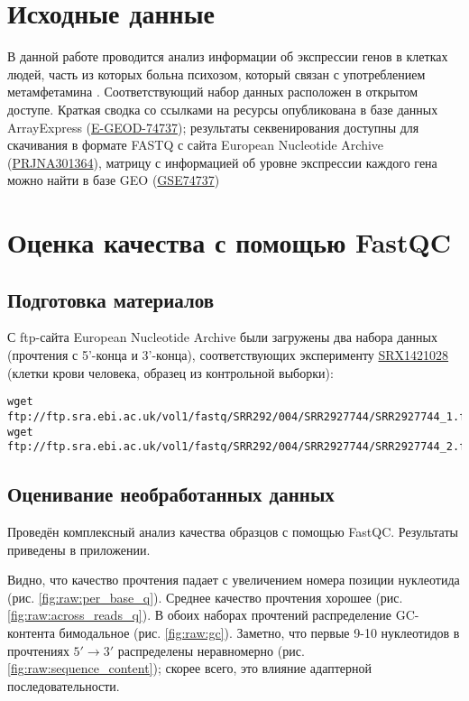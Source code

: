 \documentclass[a4paper,12pt]{article}
\begin{document}


\section{Исходные данные}

В данной работе проводится анализ информации об экспрессии генов в клетках людей, часть из которых больна психозом, который связан с употреблением метамфетамина \cite{breen}.
Соответствующий набор данных расположен в открытом доступе. Краткая сводка со ссылками на ресурсы опубликована в базе данных ArrayExpress (\href{https://www.ebi.ac.uk/arrayexpress/experiments/E-GEOD-74737/}{E-GEOD-74737}); результаты секвенирования доступны для скачивания в формате FASTQ с сайта European Nucleotide Archive (\href{https://www.ebi.ac.uk/ena/browser/view/PRJNA301364}{PRJNA301364}), матрицу с информацией об уровне экспрессии каждого гена можно найти в базе GEO (\href{https://www.ncbi.nlm.nih.gov/geo/query/acc.cgi?acc=GSE74737}{GSE74737})

\section{Оценка качества с помощью FastQC}

\subsection{Подготовка материалов}

С ftp-сайта European Nucleotide Archive были загружены два набора данных (прочтения с 5'-конца и 3'-конца), соответствующих эксперименту \href{https://www.ebi.ac.uk/ena/browser/view/SRX1421028}{SRX1421028} (клетки крови человека, образец из контрольной выборки):

\begin{lstlisting}
wget ftp://ftp.sra.ebi.ac.uk/vol1/fastq/SRR292/004/SRR2927744/SRR2927744_1.fastq.gz
wget ftp://ftp.sra.ebi.ac.uk/vol1/fastq/SRR292/004/SRR2927744/SRR2927744_2.fastq.gz
\end{lstlisting}

\subsection{Оценивание необработанных данных}

Проведён комплексный анализ качества образцов с помощью FastQC.
Результаты приведены в приложении.

Видно, что качество прочтения падает с увеличением номера позиции нуклеотида (рис. \ref{fig:raw:per_base_q}).
Среднее качество прочтения хорошее (рис. \ref{fig:raw:across_reads_q}).
В обоих наборах прочтений распределение GC-контента бимодальное (рис. \ref{fig:raw:gc}).
Заметно, что первые 9-10 нуклеотидов в прочтениях $ 5' \to 3'$ распределены неравномерно (рис. \ref{fig:raw:sequence_content}); скорее всего, это влияние адаптерной последовательности.
\end{document}
